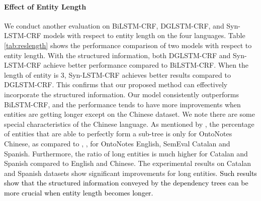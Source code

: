 \documentclass[11pt]{article}
\begin{document}
\paragraph{Effect of Entity Length}
We conduct another evaluation on BiLSTM-CRF, DGLSTM-CRF, and Syn-LSTM-CRF models with respect to entity length  on the four languages. Table \ref{tab:reslength} shows the performance comparison of two models with respect to entity length. With the structured information, both DGLSTM-CRF and Syn-LSTM-CRF achieve better performance compared to BiLSTM-CRF. When the length of entity is  3, Syn-LSTM-CRF achieves better results compared to DGLSTM-CRF. This confirms that our proposed method can effectively incorporate the structured information. Our model consistently outperforms BiLSTM-CRF, and the performance tends to have more improvements when entities are getting longer except on the Chinese dataset. 
We note there are some special characteristics of the Chinese language.  
As mentioned by \citet{Jie2019DependencyGuidedLF}, 
the percentage of entities that are able to perfectly form a sub-tree is only  for {\color{black}OntoNotes} Chinese, as compared to , ,  for OntoNotes English, SemEval Catalan and Spanish. 
Furthermore, the ratio
of long entities is much {\color{black}higher} for Catalan and Spanish compared to English and Chinese. The experimental results on Catalan and Spanish datasets show significant improvements for long entities. 
\textcolor{black}{Such results show that the structured information conveyed by the dependency trees can be more crucial when entity length becomes longer.}
\end{document}
